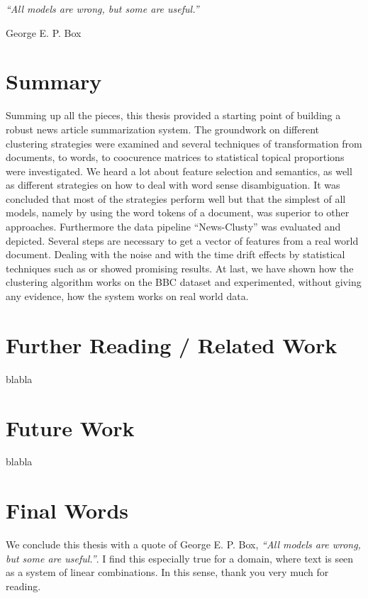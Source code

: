\epigraph{\emph{
  ``All models are wrong, but some are useful.''
}}{ George E. P. Box }

\section{Summary}
Summing up all the pieces, this thesis provided a starting point of building a robust  news article summarization system. The groundwork on different clustering strategies were examined and several techniques of transformation from documents, to words, to coocurence matrices to statistical topical proportions were investigated. We heard a lot about feature selection and semantics, as well as different strategies on how to deal with word sense disambiguation. It was concluded that most of the strategies perform well but that the simplest of all models, namely by using the word tokens of a document, was superior to other approaches. Furthermore the data pipeline ``News-Clusty'' was evaluated and depicted. Several steps are necessary to get a vector of features from a real world document. Dealing with the noise and with the time drift effects by statistical techniques such as \lsa{} or \lda{} showed promising results. At last, we have shown how the clustering algorithm works on the BBC dataset and experimented, without giving any evidence, how the system works on real world data.

\section{Further Reading / Related Work}

blabla

\section{Future Work}

blabla

\section{Final Words}

We conclude this thesis with a quote of George E. P. Box, \emph{``All models are wrong, but some are useful.''}. I find this especially true for a domain, where text is seen as a system of linear combinations. In this sense, thank you very much for reading.

